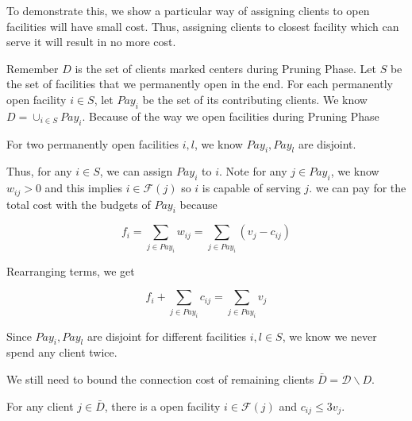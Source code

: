 To demonstrate this, we show a particular way of assigning clients to open facilities will have small cost.
Thus, assigning clients to closest facility which can serve it will result in no more cost.

Remember $D$ is the set of clients marked centers during Pruning Phase.
Let $S$ be the set of facilities that we permanently open in the end.
For each permanently open facility $i \in S$, let $Pay_i$ be the set of its contributing clients.
We know $D = \cup_{i \in S} Pay_i$.
Because of the way we open facilities during Pruning Phase

\begin{fact}
For two permanently open facilities $i, l$, we know $Pay_i, Pay_l$ are disjoint.
\end{fact}

Thus, for any $i \in S$, we can assign $Pay_i$ to $i$.
Note for any $j \in Pay_i$, we know $w_{ij} > 0$ and this implies $i \in \mathcal{F}(j)$ so $i$ is capable of serving $j$.
we can pay for the total cost with the budgets of $Pay_i$ because

\[  f_i = \sum_{j \in Pay_i} w_{ij} = \sum_{j \in Pay_i} (v_j - c_{ij}) \]

Rearranging terms, we get

\[ f_i + \sum_{j \in Pay_i} c_{ij} = \sum_{j \in Pay_i} v_j \]

Since $Pay_i, Pay_l$ are disjoint for different facilities $i, l \in S$, we know we never spend any client twice.

We still need to bound the connection cost of remaining clients $\bar D = \mathcal{D} \backslash D$.

\begin{lem}
For any client $j \in \bar D$, there is a open facility $i \in \mathcal{F}(j)$ and $c_{ij} \le 3v_j$.
\end{lem}

